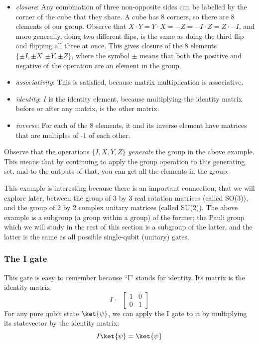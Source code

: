 \documentclass{article}
\theoremstyle{definition}
\begin{document}
\begin{example}
	\begin{itemize}
		\item \textit{closure}: \textnormal{Any combination of three non-opposite sides can be labelled by the corner of the cube that they share.  A cube has 8 corners, so there are 8 elements of our group.  Observe that $X \cdot Y = Y \cdot X = -Z = -I \cdot Z = Z \cdot -I$, and more generally, doing two different flips, is the same as doing the third flip and flipping all three at once.  This gives closure of the 8 elements $\{\pm I, \pm X, \pm Y, \pm Z\}$, where the symbol $\pm$ means that both the positive and negative of the operation are an element in the group.}
		\item \textit{associativity}: \textnormal{This is satisfied, because matrix multiplication is associative.}
		\item \textit{identity}: \textnormal{$I$ is the identity element, because multiplying the identity matrix before or after any matrix, is the other matrix.}
		\item \textit{inverse}: \textnormal{For each of the 8 elements, it and its inverse element have matrices that are multiples of -1 of each other.}
	\end{itemize}
\end{example}
Observe that the operations $\{I,X,Y,Z\}$ \textit{generate} the group in the above example.  This means that by continuing to apply the group operation to this generating set, and to the outputs of that, you can get all the elements in the group.

This example is interesting because there is an important connection, that we will explore later, between the group of 3 by 3 real rotation matrices (called SO(3)), and the group of 2 by 2 complex unitary matrices (called SU(2)).  The above example is a subgroup (a group within a group) of the former; the Pauli group which we will study in the rest of this section is a subgroup of the latter, and the latter is the same as all possible single-qubit (unitary) gates.

\subsubsection{The I gate}
This gate is easy to remember because ``I'' stands for identity.
Its matrix is the identity matrix
\begin{equation}
	I = \begin{bmatrix}
		1 & 0\\
		0 & 1
	\end{bmatrix}
\end{equation}
For any pure qubit state $\ket{\psi}$, we can apply the I gate to it by multiplying its statevector by the identity matrix:
\begin{equation}
	I \ket{\psi} = \ket{\psi}
\end{equation}
\end{document}
